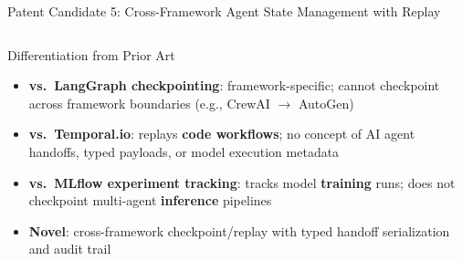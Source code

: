 \begin{frame}{\fontsize{8}{10}\selectfont Patent Candidate 5: Cross-Framework Agent State Management with Replay}
\begin{columns}[T]

    \begin{exampleblock}{\fontsize{5.5}{6.5}\selectfont Differentiation from Prior Art}
      \fontsize{5.5}{6.5}\selectfont
      \begin{itemize}
        \setlength{\itemsep}{0pt}
        \item \textbf{vs.\ LangGraph checkpointing}: framework-specific; cannot
              checkpoint across framework boundaries (e.g., CrewAI $\rightarrow$
              AutoGen)
        \item \textbf{vs.\ Temporal.io}: replays \textbf{code workflows};
              no concept of AI agent handoffs, typed payloads, or model
              execution metadata
        \item \textbf{vs.\ MLflow experiment tracking}: tracks model
              \textbf{training} runs; does not checkpoint multi-agent
              \textbf{inference} pipelines
        \item \textbf{Novel}: cross-framework checkpoint/replay with
              typed handoff serialization and audit trail
      \end{itemize}
    \end{exampleblock}
  \end{columns}
\end{frame}
